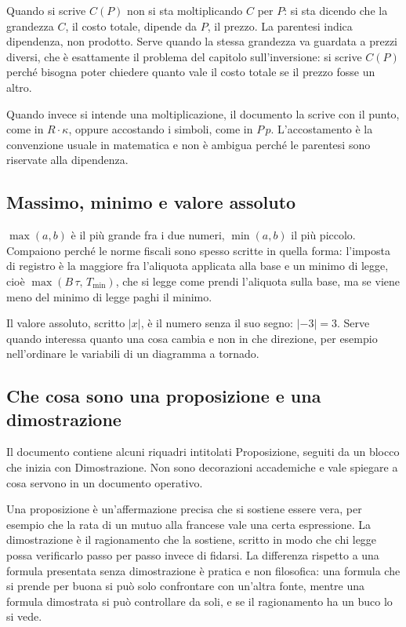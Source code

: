 \documentclass[11pt,a4paper]{article}
\theoremstyle{definition}
\theoremstyle{plain}
\begin{document}
Quando si scrive $C(P)$ non si sta moltiplicando $C$ per $P$: si sta dicendo che la grandezza $C$, il costo totale, dipende da $P$, il prezzo. La parentesi indica dipendenza, non prodotto. Serve quando la stessa grandezza va guardata a prezzi diversi, che è esattamente il problema del capitolo sull'inversione: si scrive $C(P)$ perché bisogna poter chiedere quanto vale il costo totale se il prezzo fosse un altro.

Quando invece si intende una moltiplicazione, il documento la scrive con il punto, come in $R \cdot \kappa$, oppure accostando i simboli, come in $P\,p$. L'accostamento è la convenzione usuale in matematica e non è ambigua perché le parentesi sono riservate alla dipendenza.

\subsection{Massimo, minimo e valore assoluto}

$\max(a,b)$ è il più grande fra i due numeri, $\min(a,b)$ il più piccolo. Compaiono perché le norme fiscali sono spesso scritte in quella forma: l'imposta di registro è la maggiore fra l'aliquota applicata alla base e un minimo di legge, cioè $\max(B\,\tau,\,T_{\min})$, che si legge come prendi l'aliquota sulla base, ma se viene meno del minimo di legge paghi il minimo.

Il valore assoluto, scritto $|x|$, è il numero senza il suo segno: $|-3| = 3$. Serve quando interessa quanto una cosa cambia e non in che direzione, per esempio nell'ordinare le variabili di un diagramma a tornado.

\subsection{Che cosa sono una proposizione e una dimostrazione}

Il documento contiene alcuni riquadri intitolati Proposizione, seguiti da un blocco che inizia con Dimostrazione. Non sono decorazioni accademiche e vale spiegare a cosa servono in un documento operativo.

Una proposizione è un'affermazione precisa che si sostiene essere vera, per esempio che la rata di un mutuo alla francese vale una certa espressione. La dimostrazione è il ragionamento che la sostiene, scritto in modo che chi legge possa verificarlo passo per passo invece di fidarsi. La differenza rispetto a una formula presentata senza dimostrazione è pratica e non filosofica: una formula che si prende per buona si può solo confrontare con un'altra fonte, mentre una formula dimostrata si può controllare da soli, e se il ragionamento ha un buco lo si vede.
\end{document}
